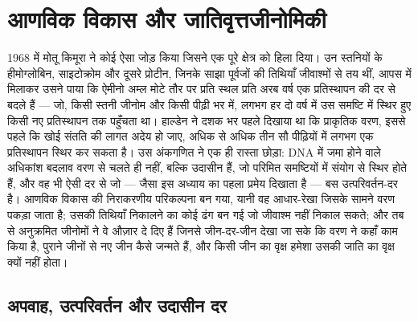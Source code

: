 \chapter{आणविक विकास और जातिवृत्तजीनोमिकी}\label{ch:b3:molecular-evolution}

1968 में मोतू किमूरा ने कोई ऐसा जोड़ किया जिसने एक पूरे क्षेत्र को हिला
दिया। उन स्तनियों के हीमोग्लोबिन, साइटोक्रोम और दूसरे प्रोटीन, जिनके
साझा पूर्वजों की तिथियाँ जीवाश्मों से तय थीं, आपस में मिलाकर उसने पाया
कि ऐमीनो अम्ल मोटे तौर पर प्रति स्थल प्रति अरब वर्ष एक प्रतिस्थापन की
दर से बदले हैं --- जो, किसी स्तनी जीनोम और किसी पीढ़ी भर में, लगभग हर दो
वर्ष में उस समष्टि में स्थिर हुए किसी नए प्रतिस्थापन तक पहुँचता था।
हाल्डेन ने दशक भर पहले दिखाया था कि प्राकृतिक वरण, इससे पहले कि खोई
संतति की लागत अदेय हो जाए, अधिक से अधिक तीन सौ पीढ़ियों में लगभग एक
प्रतिस्थापन स्थिर कर सकता है। उस अंकगणित ने एक ही रास्ता छोड़ा:
DNA में जमा होने वाले अधिकांश बदलाव वरण से चलते ही नहीं, बल्कि उदासीन
हैं, जो परिमित समष्टियों में संयोग से स्थिर होते हैं, और वह भी ऐसी दर
से जो --- जैसा इस अध्याय का पहला प्रमेय दिखाता है --- बस उत्परिवर्तन-दर
है।  आणविक विकास की निराकरणीय परिकल्पना बन गया, यानी वह
आधार-रेखा जिसके सामने वरण पकड़ा जाता है;  उसकी तिथियाँ निकालने
का कोई ढंग बन गई जो जीवाश्म नहीं निकाल सकते; और तब से अनुक्रमित जीनोमों
ने वे औज़ार दे दिए हैं जिनसे जीन-दर-जीन देखा जा सके कि वरण ने कहाँ काम
किया है, पुराने जीनों से नए जीन कैसे जन्मते हैं, और किसी जीन का वृक्ष
हमेशा उसकी जाति का वृक्ष क्यों नहीं होता।

\section{अपवाह, उत्परिवर्तन और उदासीन दर}

